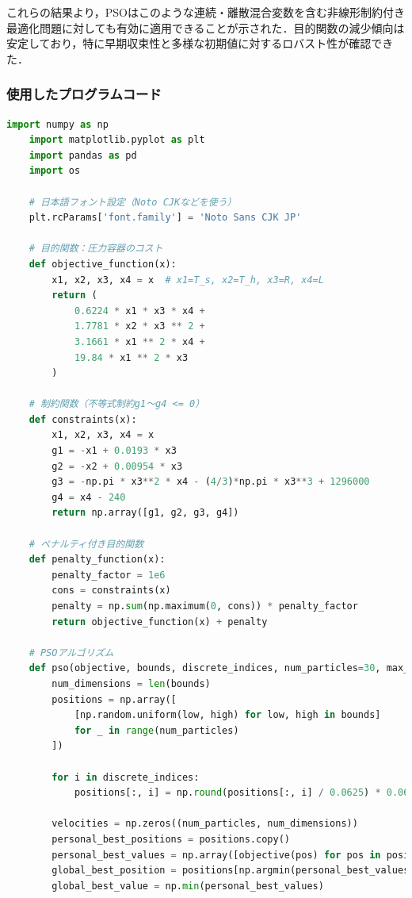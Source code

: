 これらの結果より，PSOはこのような連続・離散混合変数を含む非線形制約付き最適化問題に対しても有効に適用できることが示された．目的関数の減少傾向は安定しており，特に早期収束性と多様な初期値に対するロバスト性が確認できた．

\subsubsection{使用したプログラムコード}

\begin{lstlisting}[language=Python, caption=PSOによる圧力容器設計の最適化コード抜粋, label=lst:kadai6_code]
    import numpy as np
    import matplotlib.pyplot as plt
    import pandas as pd
    import os
    
    # 日本語フォント設定（Noto CJKなどを使う）
    plt.rcParams['font.family'] = 'Noto Sans CJK JP'
    
    # 目的関数：圧力容器のコスト
    def objective_function(x):
        x1, x2, x3, x4 = x  # x1=T_s, x2=T_h, x3=R, x4=L
        return (
            0.6224 * x1 * x3 * x4 +
            1.7781 * x2 * x3 ** 2 +
            3.1661 * x1 ** 2 * x4 +
            19.84 * x1 ** 2 * x3
        )
    
    # 制約関数（不等式制約g1〜g4 <= 0）
    def constraints(x):
        x1, x2, x3, x4 = x
        g1 = -x1 + 0.0193 * x3
        g2 = -x2 + 0.00954 * x3
        g3 = -np.pi * x3**2 * x4 - (4/3)*np.pi * x3**3 + 1296000
        g4 = x4 - 240
        return np.array([g1, g2, g3, g4])
    
    # ペナルティ付き目的関数
    def penalty_function(x):
        penalty_factor = 1e6
        cons = constraints(x)
        penalty = np.sum(np.maximum(0, cons)) * penalty_factor
        return objective_function(x) + penalty
    
    # PSOアルゴリズム
    def pso(objective, bounds, discrete_indices, num_particles=30, max_iter=100, w=0.5, c1=2, c2=2):
        num_dimensions = len(bounds)
        positions = np.array([
            [np.random.uniform(low, high) for low, high in bounds]
            for _ in range(num_particles)
        ])
        
        for i in discrete_indices:
            positions[:, i] = np.round(positions[:, i] / 0.0625) * 0.0625
    
        velocities = np.zeros((num_particles, num_dimensions))
        personal_best_positions = positions.copy()
        personal_best_values = np.array([objective(pos) for pos in positions])
        global_best_position = positions[np.argmin(personal_best_values)]
        global_best_value = np.min(personal_best_values)
    

\end{lstlisting}
